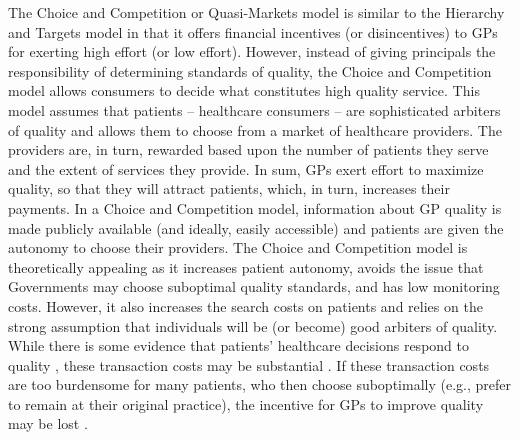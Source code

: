 \documentclass[12pt]{article}
\begin{document}
The Choice and Competition or Quasi-Markets \citep{legrandOtherInvisibleHand2007} model is similar to the Hierarchy and Targets model in that it offers financial incentives (or disincentives) to GPs for exerting high effort (or low effort). However, instead of giving principals the responsibility of determining standards of quality, the Choice and Competition model allows consumers to decide what constitutes high quality service. This model assumes that patients -- healthcare consumers -- are sophisticated arbiters of quality and allows them to choose from a market of healthcare providers. The providers are, in turn, rewarded based upon the number of patients they serve and the extent of services they provide. In sum, GPs exert effort to maximize quality, so that they will attract patients, which, in turn, increases their payments. In a Choice and Competition model, information about GP quality is made publicly available (and ideally, easily accessible) and patients are given the autonomy to choose their providers. The Choice and Competition model is theoretically appealing as it increases patient autonomy, avoids the issue that Governments may choose suboptimal quality standards, and has low monitoring costs. However, it also increases the search costs on patients and relies on the strong assumption that individuals will be (or become) good arbiters of quality. While there is some evidence that patients' healthcare decisions respond to quality \citep{howardQualityConsumerChoice2006}, these transaction costs may be substantial \citep{mageePublicViewsHealthcare2003}. If these transaction costs are too burdensome for many patients, who then choose suboptimally (e.g., prefer to remain at their original practice), the incentive for GPs to improve quality may be lost \citep{fotakiPatientChoiceFuture2013}.
\end{document}
